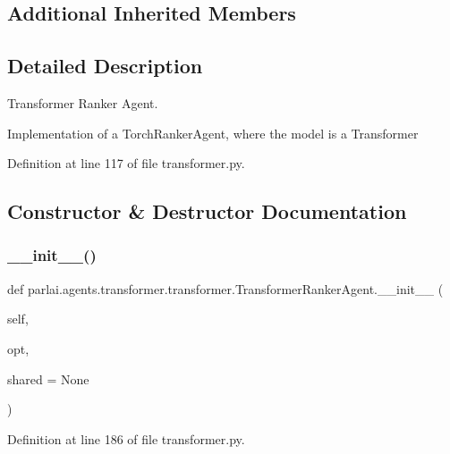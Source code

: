 \subsection*{Additional Inherited Members}


\subsection{Detailed Description}
\begin{DoxyVerb}Transformer Ranker Agent.

Implementation of a TorchRankerAgent, where the model is a Transformer
\end{DoxyVerb}
 

Definition at line 117 of file transformer.\+py.



\subsection{Constructor \& Destructor Documentation}
\mbox{\label{classparlai_1_1agents_1_1transformer_1_1transformer_1_1TransformerRankerAgent_a677c14e106614404f5c5f8605b90ce3e}} 
\subsubsection{\texorpdfstring{\+\_\+\+\_\+init\+\_\+\+\_\+()}{\_\_init\_\_()}}
{\footnotesize\ttfamily def parlai.\+agents.\+transformer.\+transformer.\+Transformer\+Ranker\+Agent.\+\_\+\+\_\+init\+\_\+\+\_\+ (\begin{DoxyParamCaption}\item[{}]{self,  }\item[{}]{opt,  }\item[{}]{shared = {\ttfamily None} }\end{DoxyParamCaption})}



Definition at line 186 of file transformer.\+py.


